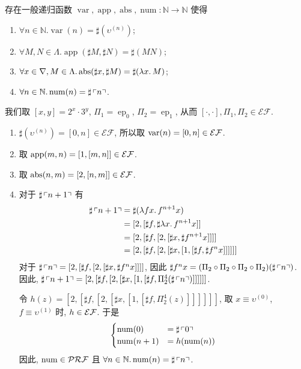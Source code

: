 \begin{problem}
存在一般递归函数 $\operatorname{var}, \operatorname{app}, \operatorname{abs}, \operatorname{num}: \mathbb{N} \to \mathbb{N}$ 使得
\begin{enumerate}
\item $\forall n \in \mathbb{N}. \operatorname{var}(n) = \sharp (\upsilon^{(n)})$;
\item $\forall M, N \in \Lambda. \operatorname{app}(\sharp M, \sharp N) = \sharp(M N)$;
\item $\forall x \in \nabla, M \in \Lambda. \operatorname{abs}(\sharp x, \sharp M) = \sharp (\lambda {x}.\,{M})$;
\item $\forall n \in \mathbb{N}. \operatorname{num}(n) = \sharp \left\ulcorner n \right\urcorner$.
\end{enumerate}
\end{problem}

\begin{solution}
我们取 $[x,y] = 2^x \cdot 3^y$, $\Pi_1 = \operatorname{ep}_0$, $\Pi_2 = \operatorname{ep}_1$, 从而 $[\cdot,\cdot], \Pi_1, \Pi_2 \in \mathcal{EF}$.

\begin{enumerate}
\item $\sharp (\upsilon^{(n)}) = [0, n] \in \mathcal{EF}$, 所以取 $\operatorname{var}(n) = [0, n] \in \mathcal{EF}$.
\item 取 $\operatorname{app}(m,n) = [1,[m,n]] \in \mathcal{EF}$.
\item 取 $\operatorname{abs}(n,m)=[2,[n, m]] \in \mathcal{EF}$.
\item 对于 $\sharp \left\ulcorner n + 1 \right\urcorner$ 有
\begin{align*}
\sharp \left\ulcorner n + 1 \right\urcorner & = \sharp(\lambda {fx}.\,{f^{n+1}x}) \\
& = [2, [\sharp f, \sharp \lambda {x}.\,{f^{n+1}x}]] \\
& = [2, [\sharp f, [2, [\sharp x, \sharp f^{n+1}x]]]] \\
& = [2, [\sharp f, [2, [\sharp x, [1, [\sharp f, \sharp f^n x]]]]]]
\end{align*}
对于 $\sharp \left\ulcorner n \right\urcorner = [2, [\sharp f, [2, [\sharp x, \sharp f^n x]]]]$, 因此 $\sharp f^n x = (\Pi_2 \circ \Pi_2 \circ \Pi_2 \circ \Pi_2) (\sharp \left\ulcorner n \right\urcorner)$. 因此, $\sharp \left\ulcorner n+1 \right\urcorner = [2, [\sharp f, [2, [\sharp x, [1, [\sharp f, \Pi_2^4(\sharp \left\ulcorner n \right\urcorner)]]]]]]$.

令 $h(z) = [2, [\sharp f, [2, [\sharp x, [1, [\sharp f, \Pi_2^4 (z)]]]]]]$, 取 $x \equiv \upsilon^{(0)}$, $f \equiv \upsilon^{(1)}$ 时, $h \in \mathcal{EF}$. 于是
\[
\begin{cases}
\operatorname{num}(0) & = \sharp \left\ulcorner 0 \right\urcorner \\
\operatorname{num}(n+1) & = h(\operatorname{num}(n))
\end{cases}
\]
因此, $\operatorname{num} \in \mathcal{PRF}$ 且 $\forall n \in \mathbb{N}. \operatorname{num}(n) = \sharp \left\ulcorner n \right\urcorner$.
\end{enumerate}
\end{solution}
